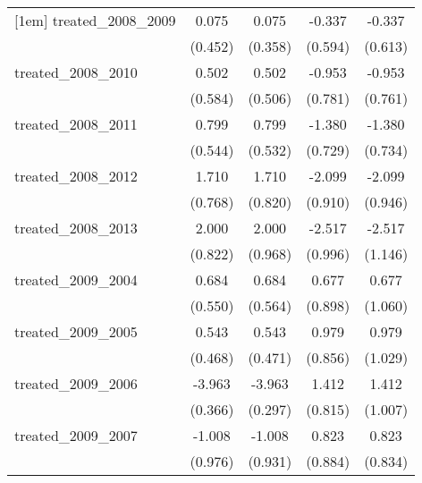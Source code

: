 {\begin{tabular}{l*{4}{c}}
[1em]
treated\_2008\_2009&       0.075         &       0.075         &      -0.337         &      -0.337         \\
            &     (0.452)         &     (0.358)         &     (0.594)         &     (0.613)         \\
[1em]
treated\_2008\_2010&       0.502         &       0.502         &      -0.953         &      -0.953         \\
            &     (0.584)         &     (0.506)         &     (0.781)         &     (0.761)         \\
[1em]
treated\_2008\_2011&       0.799         &       0.799         &      -1.380         &      -1.380         \\
            &     (0.544)         &     (0.532)         &     (0.729)         &     (0.734)         \\
[1em]
treated\_2008\_2012&       1.710\sym{*}  &       1.710\sym{*}  &      -2.099\sym{*}  &      -2.099\sym{*}  \\
            &     (0.768)         &     (0.820)         &     (0.910)         &     (0.946)         \\
[1em]
treated\_2008\_2013&       2.000\sym{*}  &       2.000\sym{*}  &      -2.517\sym{*}  &      -2.517\sym{*}  \\
            &     (0.822)         &     (0.968)         &     (0.996)         &     (1.146)         \\
[1em]
treated\_2009\_2004&       0.684         &       0.684         &       0.677         &       0.677         \\
            &     (0.550)         &     (0.564)         &     (0.898)         &     (1.060)         \\
[1em]
treated\_2009\_2005&       0.543         &       0.543         &       0.979         &       0.979         \\
            &     (0.468)         &     (0.471)         &     (0.856)         &     (1.029)         \\
[1em]
treated\_2009\_2006&      -3.963\sym{***}&      -3.963\sym{***}&       1.412         &       1.412         \\
            &     (0.366)         &     (0.297)         &     (0.815)         &     (1.007)         \\
[1em]
treated\_2009\_2007&      -1.008         &      -1.008         &       0.823         &       0.823         \\
            &     (0.976)         &     (0.931)         &     (0.884)         &     (0.834)         \\

\end{tabular}}
